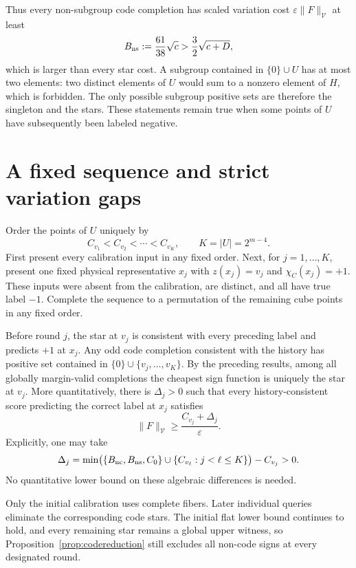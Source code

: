 \documentclass[11pt]{article}
\newcommand{\cV}{\mathcal V}
\newcommand{\eps}{\varepsilon}
\begin{document}
Thus every non-subgroup code completion has scaled variation cost
$\eps\|F\|_{\cV}$ at least
\begin{equation}\label{eq:nonsubgroupbarrier}
 B_{\rm ns}:=\frac{61}{38}\sqrt c
    >\frac32\sqrt{c+D},
\end{equation}
which is larger than every star cost. A subgroup contained in
$\{0\}\cup U$ has at most two elements: two distinct elements of $U$
would sum to a nonzero element of $H$, which is forbidden. The only
possible subgroup positive sets are therefore the singleton and the
stars. These statements remain true when some points of $U$ have
subsequently been labeled negative.

\section{A fixed sequence and strict variation gaps}

Order the points of $U$ uniquely by
\[
 C_{v_1}<C_{v_2}<\cdots<C_{v_K},\qquad K=|U|=2^{m-4}.
\]
First present every calibration input in any fixed order. Next, for
$j=1,\ldots,K$, present one fixed physical representative $x_j$ with
$z(x_j)=v_j$ and $\chi_C(x_j)=+1$. These inputs were absent from the
calibration, are distinct, and all have true label $-1$. Complete the
sequence to a permutation of the remaining cube points in any fixed
order.

Before round $j$, the star at $v_j$ is consistent with every preceding
label and predicts $+1$ at $x_j$. Any odd code completion consistent
with the history has positive set contained in
$\{0\}\cup\{v_j,\ldots,v_K\}$. By the preceding results, among all
globally margin-valid completions the cheapest sign function is uniquely
the star at $v_j$. More quantitatively, there is $\Delta_j>0$ such that
every history-consistent score predicting the correct label at $x_j$
satisfies
\begin{equation}\label{eq:variationgap}
 \|F\|_{\cV}\ge\frac{C_{v_j}+\Delta_j}{\eps}.
\end{equation}
Explicitly, one may take
\[
 \Delta_j=\min\bigl(\{B_{\rm nc},B_{\rm ns},C_0\}
                  \cup\{C_{v_\ell}:j<\ell\le K\}\bigr)-C_{v_j}>0.
\]
No quantitative lower bound on these algebraic differences is needed.

Only the initial calibration uses complete fibers. Later individual
queries eliminate the corresponding code stars. The initial flat
lower bound continues to hold, and every remaining star remains a
global upper witness, so Proposition~\ref{prop:codereduction} still
excludes all non-code signs at every designated round.
\end{document}
